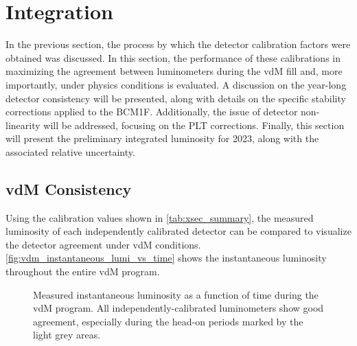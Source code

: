 \newpage

\section{Integration}

In the previous section, the process by which the detector calibration factors were obtained was discussed. In this section, the performance of these calibrations in maximizing the agreement between luminometers during the vdM fill and, more importantly, under physics conditions is evaluated. A discussion on the year-long detector consistency will be presented, along with details on the specific stability corrections applied to the BCM1F. Additionally, the issue of detector non-linearity will be addressed, focusing on the PLT corrections. Finally, this section will present the preliminary integrated luminosity for 2023, along with the associated relative uncertainty.

\newpage

\subsection{vdM Consistency}
\label{subsec:vdm_consistency}

Using the calibration values shown in \autoref{tab:xsec_summary}, the measured luminosity of each independently calibrated detector can be compared to visualize the detector agreement under vdM conditions. \autoref{fig:vdm_instantaneous_lumi_vs_time} shows the instantaneous luminosity throughout the entire vdM program.

\begin{figure}[!htb]
	\centering
	\caption[Instantaneous luminosity during vdM]{Measured instantaneous luminosity as a function of time during the vdM program. All independently-calibrated luminometers show good agreement, especially during the head-on periods marked by the light grey areas.}
	\label{fig:vdm_instantaneous_lumi_vs_time}
\end{figure}

